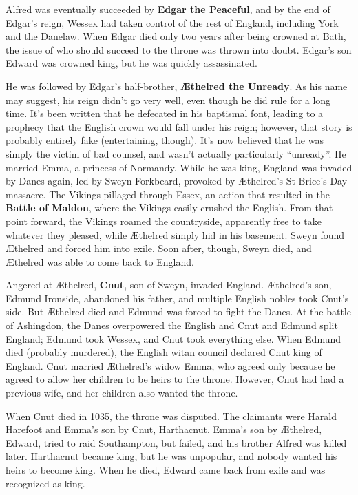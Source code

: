 Alfred was eventually succeeded by \textbf{Edgar the Peaceful}, and by the end of Edgar's reign,
Wessex had taken control of the rest of England, including York and the Danelaw.
When Edgar died only two years after being crowned at Bath,
the issue of who should succeed to the throne was thrown into doubt.
Edgar's son Edward was crowned king, but he was quickly assassinated.

He was followed by Edgar's half-brother, \textbf{\AE{}thelred the Unready}.
As his name may suggest, his reign didn't go very well, even though he did rule for a long time.
It's been written that he defecated in his baptismal font,
leading to a prophecy that the English crown would fall under his reign;
however, that story is probably entirely fake (entertaining, though).
It's now believed that he was simply the victim of bad counsel, and wasn't actually particularly ``unready''.
He married Emma, a princess of Normandy.
While he was king, England was invaded by Danes again, led by Sweyn Forkbeard,
provoked by \AE{}thelred's St Brice's Day massacre.
The Vikings pillaged through Essex, an action that resulted in the \textbf{Battle of Maldon},
where the Vikings easily crushed the English.
From that point forward, the Vikings roamed the countryside, apparently free to take whatever they pleased,
while \AE{}thelred simply hid in his basement.
Sweyn found \AE{}thelred and forced him into exile.
Soon after, though, Sweyn died, and \AE{}thelred was able to come back to England.

Angered at \AE{}thelred, \textbf{Cnut}, son of Sweyn, invaded England.
\AE{}thelred's son, Edmund Ironside, abandoned his father, and multiple English nobles took Cnut's side.
But \AE{}thelred died and Edmund was forced to fight the Danes.
At the battle of Ashingdon, the Danes overpowered the English and Cnut and Edmund split England;
Edmund took Wessex, and Cnut took everything else.
When Edmund died (probably murdered), the English witan council declared Cnut king of England.
Cnut married \AE{}thelred's widow Emma,
who agreed only because he agreed to allow her children to be heirs to the throne.
However, Cnut had had a previous wife, and her children also wanted the throne.

When Cnut died in 1035, the throne was disputed.
The claimants were Harald Harefoot and Emma's son by Cnut, Harthacnut.
Emma's son by \AE{}thelred, Edward, tried to raid Southampton, but failed, and his brother Alfred was killed later.
Harthacnut became king, but he was unpopular, and nobody wanted his heirs to become king.
When he died, Edward came back from exile and was recognized as king.

